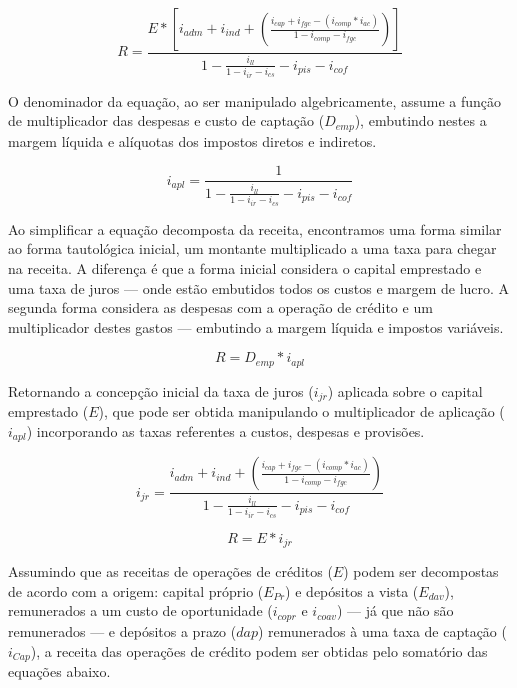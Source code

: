 \documentclass[
  12pt,
  12pt,
  openright,
  oneside,
  a4paper,
  chapter=TITLE,
  section=TITLE,
  subsection=TITLE,
  subsubsection=TITLE,
  english,
  portugues,
  sumario=tradicional]{abntex2}
\begin{document}
\begin{equation}
R =  \frac{E * [i_{adm} + i_{ind} + (\frac{i_{cap}+ i_{fgc} - (i_{comp}*i_{ac})}{1 - i_{comp} - i_{fgc}})]}
{1 -  \frac{i_{ll}}{1 - i_{ir}  - i_{cs}} - i_{pis} - i_{cof}}
\end{equation}

O denominador da equação, ao ser manipulado algebricamente, assume a função de multiplicador das despesas e custo de captação (\(D_{emp}\)), embutindo nestes a margem líquida e alíquotas dos impostos diretos e indiretos.

\begin{equation}
i_{apl} = \frac{1}{1 -  \frac{i_{ll}}{1 - i_{ir}  - i_{cs}} - i_{pis} - i_{cof}}
\end{equation}

Ao simplificar a equação decomposta da receita, encontramos uma forma similar ao forma tautológica inicial, um montante multiplicado a uma taxa para chegar na receita. A diferença é que a forma inicial considera o capital emprestado e uma taxa de juros --- onde estão embutidos todos os custos e margem de lucro. A segunda forma considera as despesas com a operação de crédito e um multiplicador destes gastos --- embutindo a margem líquida e impostos variáveis.

\begin{equation}
R = D_{emp} * i_{apl}
\end{equation}

Retornando a concepção inicial da taxa de juros (\(i_{jr}\)) aplicada sobre o capital emprestado (\(E\)), que pode ser obtida manipulando o multiplicador de aplicação (\(i_{apl}\)) incorporando as taxas referentes a custos, despesas e provisões.

\begin{equation}
i_{jr} = \frac{i_{adm} + i_{ind} + (\frac{i_{cap}+ i_{fgc} - (i_{comp}*i_{ac})}{1 - i_{comp} - i_{fgc}})}{1 -  \frac{i_{ll}}{1 - i_{ir}  - i_{cs}} - i_{pis} - i_{cof}}
\end{equation}

\begin{equation}
R = E * i_{jr} 
\end{equation}

Assumindo que as receitas de operações de créditos (\(E\)) podem ser decompostas de acordo com a origem: capital próprio (\(E_{Pr}\)) e depósitos a vista (\(E_{dav}\)), remunerados a um custo de oportunidade (\(i_{copr}\) e \(i_{coav}\)) --- já que não são remunerados --- e depósitos a prazo (\(dap\)) remunerados à uma taxa de captação (\(i_{Cap}\)), a receita das operações de crédito podem ser obtidas pelo somatório das equações abaixo.
\end{document}
